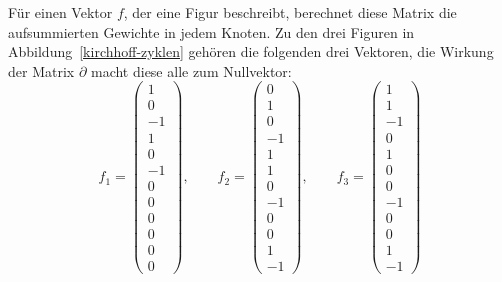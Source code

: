 Für einen Vektor $f$, der eine Figur beschreibt, berechnet diese
Matrix die aufsummierten Gewichte in jedem Knoten.
Zu den drei Figuren in Abbildung~\ref{kirchhoff-zyklen} gehören
die folgenden drei Vektoren, die Wirkung der Matrix $\partial$
macht diese alle zum Nullvektor:
\[
f_1=\begin{pmatrix}
1\\0\\-1\\1\\0\\-1\\0\\0\\0\\0\\0\\0
\end{pmatrix},
\qquad
f_2=\begin{pmatrix}
0\\1\\0\\-1\\1\\1\\0\\-1\\0\\0\\1\\-1
\end{pmatrix},
\qquad
f_3=\begin{pmatrix}
1\\1\\-1\\0\\1\\0\\0\\-1\\0\\0\\1\\-1
\end{pmatrix}
\]
